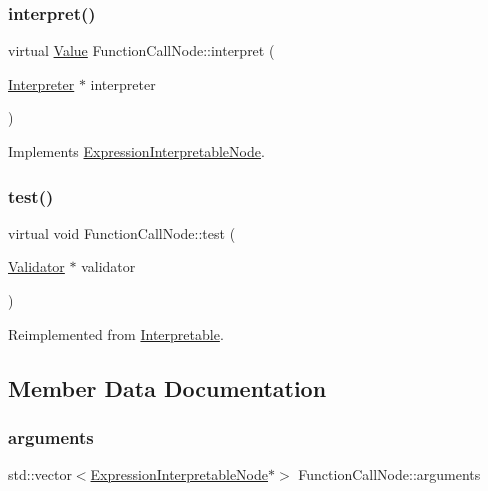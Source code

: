 \subsubsection{\texorpdfstring{interpret()}{interpret()}}
{\footnotesize\ttfamily virtual \hyperlink{classValue}{Value} Function\+Call\+Node\+::interpret (\begin{DoxyParamCaption}\item[{\hyperlink{classInterpreter}{Interpreter} $\ast$}]{interpreter }\end{DoxyParamCaption})\hspace{0.3cm}{\ttfamily [virtual]}}



Implements \hyperlink{classExpressionInterpretableNode_a43650f046c48fc539f77a207e3c9181e}{Expression\+Interpretable\+Node}.

\mbox{\label{classFunctionCallNode_a5a7f576984942e2e39057d716d8a5547}} 
\subsubsection{\texorpdfstring{test()}{test()}}
{\footnotesize\ttfamily virtual void Function\+Call\+Node\+::test (\begin{DoxyParamCaption}\item[{\hyperlink{classValidator}{Validator} $\ast$}]{validator }\end{DoxyParamCaption})\hspace{0.3cm}{\ttfamily [virtual]}}



Reimplemented from \hyperlink{classInterpretable_a32f547aaf68dcbab993284d3257ab010}{Interpretable}.



\subsection{Member Data Documentation}
\mbox{\label{classFunctionCallNode_a087579d1f0ece94640b4821830f72b55}} 
\subsubsection{\texorpdfstring{arguments}{arguments}}
{\footnotesize\ttfamily std\+::vector$<$\hyperlink{classExpressionInterpretableNode}{Expression\+Interpretable\+Node}$\ast$$>$ Function\+Call\+Node\+::arguments}


